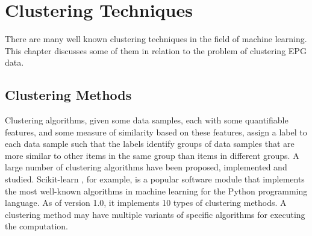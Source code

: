 
\chapter{Clustering Techniques}
\label{ch:Clustering Techniques}
\thispagestyle{myheadings}

There are many well known clustering techniques in the field of machine learning. This chapter discusses some of them in relation to the problem of clustering EPG data.

\section{Clustering Methods}

Clustering algorithms, given some data samples, each with some quantifiable features, and some measure of similarity based on these features, assign a label to each data sample such that the labels identify groups of data samples that are more similar to other items in the same group than items in different groups. A large number of clustering algorithms have been proposed, implemented and studied. Scikit-learn \cite{pedregosa_scikit-learn_2011}, for example, is a popular software module that implements the most well-known algorithms in machine learning for the Python programming language. As of version 1.0, it implements 10 types of clustering methods. A clustering method may have multiple variants of specific algorithms for executing the computation.

